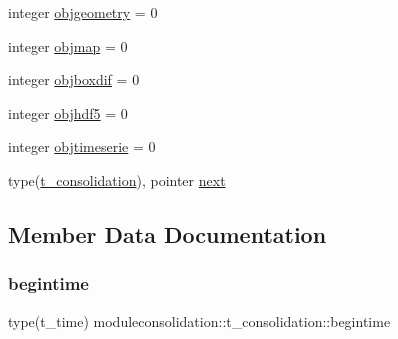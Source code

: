 \begin{DoxyCompactItemize}
integer \mbox{\hyperlink{structmoduleconsolidation_1_1t__consolidation_ae6f490c6c3f08b5e7e421d8d29dfb908}{objgeometry}} = 0
\item 
integer \mbox{\hyperlink{structmoduleconsolidation_1_1t__consolidation_abb35765aa1fd34415295358a4d0eba79}{objmap}} = 0
\item 
integer \mbox{\hyperlink{structmoduleconsolidation_1_1t__consolidation_aba2c53ee453004036bf4e538223ec6fe}{objboxdif}} = 0
\item 
integer \mbox{\hyperlink{structmoduleconsolidation_1_1t__consolidation_afdb90e9258b34725b28e8e39a6b99528}{objhdf5}} = 0
\item 
integer \mbox{\hyperlink{structmoduleconsolidation_1_1t__consolidation_a1194cd714a5c4abf6896c53597ef62e0}{objtimeserie}} = 0
\item 
type(\mbox{\hyperlink{structmoduleconsolidation_1_1t__consolidation}{t\+\_\+consolidation}}), pointer \mbox{\hyperlink{structmoduleconsolidation_1_1t__consolidation_aa05f8d8f1ce7d831da62799073226e7d}{next}}
\end{DoxyCompactItemize}


\subsection{Member Data Documentation}
\mbox{\label{structmoduleconsolidation_1_1t__consolidation_a8bbb8b15e0e07d9f52b79ac787c22c6c}} 
\subsubsection{\texorpdfstring{begintime}{begintime}}
{\footnotesize\ttfamily type(t\+\_\+time) moduleconsolidation\+::t\+\_\+consolidation\+::begintime\hspace{0.3cm}{\ttfamily [private]}}

\mbox{\label{structmoduleconsolidation_1_1t__consolidation_ad5707a193bb0b4489a810231eb8f2041}} 
